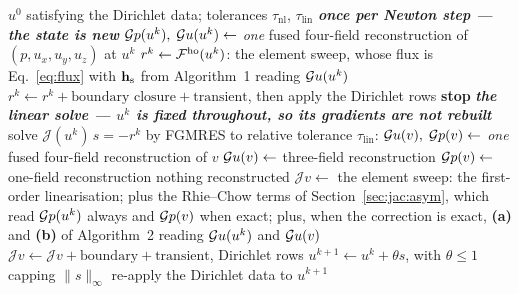 \begin{algorithm}[H]
\caption{Newton--Krylov with the higher-order scheme}
\label{alg:newton}
\begin{algorithmic}[1]
\Require $u^0$ satisfying the Dirichlet data; tolerances $\tau_{\text{nl}}$, $\tau_{\text{lin}}$
  \Statex \textbf{\emph{once per Newton step --- the state is new}}
  \State $\mathcal{G} p(u^k),\; \mathcal{G} u(u^k) \gets$ \emph{one} fused four-field reconstruction of
         $(p, u_x, u_y, u_z)$ at $u^k$
  \State $r^k \gets \mathcal{F}^{\mathrm{ho}}(u^k)$: the element sweep, whose flux is Eq.~\eqref{eq:flux} with
         $\mathbf{h}_{\mathrm{s}}$ from Algorithm~1 reading $\mathcal{G} u(u^k)$
  \State $r^k \gets r^k + \text{boundary closure} + \text{transient}$, then apply the Dirichlet
         rows
   \textbf{stop} \EndIf
  \Statex \textbf{\emph{the linear solve --- $u^k$ is fixed throughout, so its gradients are not
          rebuilt}}
  \State solve $\mathcal{J}(u^k)\,s = -r^k$ by FGMRES to relative tolerance $\tau_{\text{lin}}$:
      \State $\mathcal{G} u(v),\; \mathcal{G} p(v) \gets$ \emph{one} fused four-field reconstruction of $v$
      \State $\mathcal{G} u(v) \gets$ three-field reconstruction
      \State $\mathcal{G} p(v) \gets$ one-field reconstruction \Comment{$\Jex$}
    \Else
      \State nothing reconstructed 
    \EndIf
    \State $\mathcal{J}v \gets$ the element sweep: the first-order linearisation; plus the
           Rhie--Chow terms of Section~\ref{sec:jac:asym}, which read $\mathcal{G} p(u^k)$ always and
           $\mathcal{G} p(v)$ when exact; plus, when the correction is exact, \textbf{(a)} and
           \textbf{(b)} of Algorithm~2 reading $\mathcal{G} u(u^k)$ and $\mathcal{G} u(v)$
    \State $\mathcal{J}v \gets \mathcal{J}v + \text{boundary} + \text{transient}$, Dirichlet rows
  \EndFor
  \State $u^{k+1} \gets u^k + \theta s$, with $\theta \le 1$ capping $\|s\|_\infty$
  \State re-apply the Dirichlet data to $u^{k+1}$
\EndFor
\end{algorithmic}
\end{algorithm}

